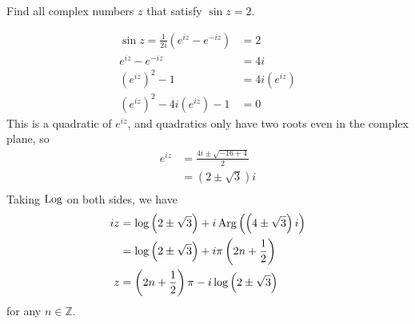 \documentclass[12pt]{article}
\begin{document}
    \begin{question}
        Find all complex numbers $z$ that satisfy $\sin z = 2$.
    \end{question}
    \begin{answer}
        \begin{align*}
            \sin z = \frac{1}{2i}(e^{iz} - e^{-iz})
            &= 2\\
            e^{iz} - e^{-iz}
            &= 4i\\
            (e^{iz})^{2} - 1
            &= 4i(e^{iz})\\
            (e^{iz})^{2} - 4i(e^{iz}) - 1
            &= 0
        \end{align*}
        This is a quadratic of $e^{iz}$, and quadratics
        only have two roots even in the complex plane, so
        \begin{align*}
        e^{iz} 
        &= \frac{4i \pm \sqrt{-16 + 4}}{2}\\
        &= \left(2 \pm \sqrt{3}\right)i\\
        \end{align*}
        Taking $\operatorname{Log}$ on both sides, we have
        \begin{align*}
        iz
        &= \log\left(2 \pm \sqrt{3}\right) + i \operatorname{Arg}\left(\left(4 \pm \sqrt{3}\right)i\right)\\
        &= \log\left(2 \pm \sqrt{3}\right) + i\pi\left(2n+\frac{1}{2}\right)\\
        z
        &= \left(2n+\frac{1}{2}\right)\pi-i\log\left(2 \pm \sqrt{3}\right)
        \end{align*}
        for any $n \in \mathbb{Z}$.
    \end{answer}
\end{document}
